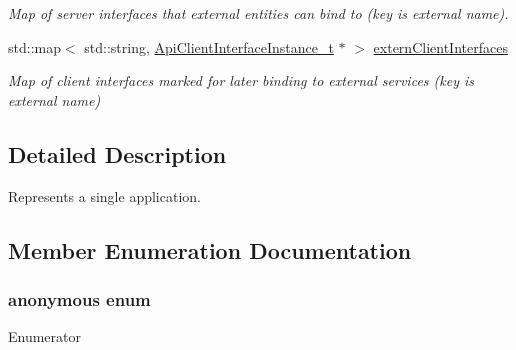 \begin{DoxyCompactItemize}
\begin{DoxyCompactList}\small\item\em Map of server interfaces that external entities can bind to (key is external name). \end{DoxyCompactList}\item 
std\+::map$<$ std\+::string, \hyperlink{structmodel_1_1_api_client_interface_instance__t}{Api\+Client\+Interface\+Instance\+\_\+t} $\ast$ $>$ \hyperlink{structmodel_1_1_app__t_a0980a6ee6effefd237fe09ae57c89028}{extern\+Client\+Interfaces}
\begin{DoxyCompactList}\small\item\em Map of client interfaces marked for later binding to external services (key is external name) \end{DoxyCompactList}\end{DoxyCompactItemize}


\subsection{Detailed Description}
Represents a single application. 

\subsection{Member Enumeration Documentation}
\subsubsection[{\texorpdfstring{anonymous enum}{anonymous enum}}]{\setlength{\rightskip}{0pt plus 5cm}anonymous enum}\hypertarget{structmodel_1_1_app__t_a76e6248e0db08be7683cf0eedbf7005d}{}\label{structmodel_1_1_app__t_a76e6248e0db08be7683cf0eedbf7005d}
\begin{Desc}
\item[Enumerator]\par
\begin{description}
\item[{\em 
A\+U\+TO\hypertarget{structmodel_1_1_app__t_a76e6248e0db08be7683cf0eedbf7005da701e541d386e264616ea7feee631393e}{}\label{structmodel_1_1_app__t_a76e6248e0db08be7683cf0eedbf7005da701e541d386e264616ea7feee631393e}
}]\item[{\em 
M\+A\+N\+U\+AL\hypertarget{structmodel_1_1_app__t_a76e6248e0db08be7683cf0eedbf7005da8c81363fab5fb67592c9b94b2bbb165a}{}\label{structmodel_1_1_app__t_a76e6248e0db08be7683cf0eedbf7005da8c81363fab5fb67592c9b94b2bbb165a}
}]\end{description}
\end{Desc}


